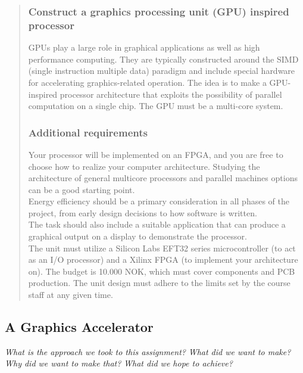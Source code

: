 \documentclass[../main/report.tex]{subfiles}
\begin{document}
\begin{quotation}
	\subsubsection{Construct a graphics processing unit (GPU) inspired processor}
    \noindent GPUs play a large role in graphical applications as well as high performance computing.
    They are typically constructed around the SIMD (single instruction multiple data) paradigm and
    include special hardware for accelerating graphics-related operation. The idea is to make a
    GPU-inspired processor architecture that exploits the possibility of parallel computation on a
    single chip. The GPU must be a multi-core system.
    
    \subsubsection{Additional requirements}
    \noindent Your processor will be implemented on an FPGA, and you are free to choose how to
    realize your computer architecture. Studying the architecture of general multicore processors
    and parallel machines options can be a good starting point.\\
    
    \noindent Energy efficiency should be a primary consideration in all phases of the project, from early
    design decisions to how software is written.\\
    
    \noindent The task should also include a suitable application that can produce a graphical output on a
    display to demonstrate the processor.\\
    
    \noindent The unit must utilize a Silicon Labs EFT32 series microcontroller (to act as an I/O processor)
    and a Xilinx FPGA (to implement your architecture on). The budget is 10.000 NOK, which must
    cover components and PCB production. The unit design must adhere to the limits set by the
    course staff at any given time.
\end{quotation}
\newpage

\subsection{A Graphics Accelerator}

\textit{What is the approach we took to this assignment?}
\textit{What did we want to make?}
\textit{Why did we want to make that?}
\textit{What did we hope to achieve?}
\end{document}
